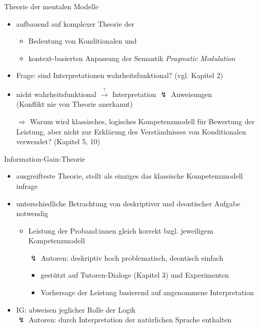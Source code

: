 \begin{frame}{Theorie der mentalen Modelle {\scriptsize \cite[S.~113-114]{stenningHumanReasoningCognitive2008}}}
    \begin{itemize}
        \item aufbauend auf komplexer Theorie der
        \begin{itemize}
            \item Bedeutung von Konditionalen und
            \item kontext-basierten Anpassung der Semantik {\footnotesize \emph{Pragmatic Modulation}}
        \end{itemize}
        
        \item Frage: sind Interpretationen wahrheitsfunktional? {\scriptsize (vgl. Kapitel 2)}
        
        \item nicht wahrheitsfunktional $\overset?\to$ Interpretation $\lightning$ Anweisungen \\
            {\footnotesize (Konflikt nie von Theorie anerkannt)}
        \pause

        \item[$\Rightarrow$] Warum wird klassisches, logisches Kompetenzmodell für \alert{Bewertung der Leistung}, 
            aber nicht zur Erklärung des \alert{Verständnisses von Konditionalen} verwendet? {\footnotesize (Kapitel 5, 10)}
    \end{itemize}
\end{frame}


\begin{frame}{Information-Gain-Theorie {\scriptsize \cite[S.~114-115]{stenningHumanReasoningCognitive2008}}}
    \begin{itemize}
        \item ausgreifteste Theorie, stellt als einziges das klassische Kompetenzmodell infrage
        \item unterschiedliche Betrachtung von deskriptiver und deontischer Aufgabe notwendig
        \begin{itemize}
            \item Leistung der Proband:innen gleich korrekt bzgl. jeweiligem Kompetenzmodell
            \item[$\lightning$] Autoren: deskriptiv hoch problematisch, deontisch einfach
            \begin{itemize}
                \item gestützt auf Tutoren-Dialoge (Kapitel 3) und Experimenten
                \item Vorhersage der Leistung basierend auf angenommene Interpretation
            \end{itemize}
        \end{itemize}
        \item IG: abweisen jeglicher Rolle der Logik \\
            $\lightning$ Autoren: durch Interpretation der natürlichen Sprache enthalten
    \end{itemize}
\end{frame}


